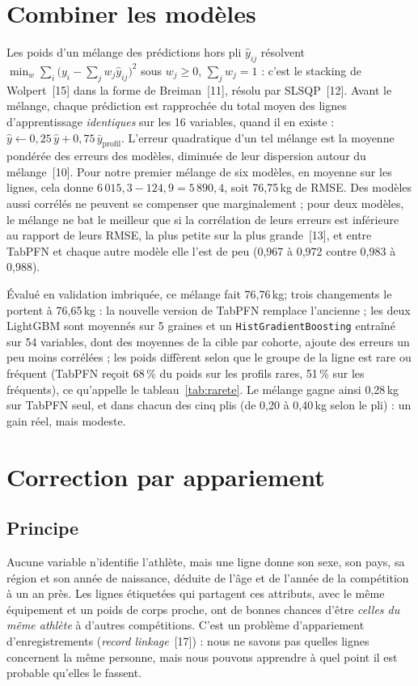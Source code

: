 \documentclass[11pt,a4paper]{article}
\newcommand{\code}[1]{\texttt{\small #1}}
\newcommand{\kg}{\,kg}
\newcounter{tab}
\begin{document}
\section{Combiner les modèles}\label{sec:melange}
Les poids d'un mélange des prédictions hors pli $\hat y_{ij}$ résolvent
$\min_w \sum_i \big(y_i - \sum_j w_j \hat y_{ij}\big)^2$ sous $w_j \ge 0$, $\sum_j w_j = 1$ : c'est le stacking de
Wolpert~[15] dans la forme de Breiman~[11], résolu par SLSQP~[12]. Avant le mélange, chaque prédiction est
rapprochée du total moyen des lignes d'apprentissage \emph{identiques} sur les 16 variables, quand il en
existe : $\hat y \leftarrow 0{,}25\,\hat y + 0{,}75\,\bar y_{\text{profil}}$. L'erreur quadratique d'un tel mélange
est la moyenne pondérée des erreurs des modèles, diminuée de leur dispersion autour du mélange~[10]. Pour
notre premier mélange de six modèles, en moyenne sur les lignes, cela donne $6\,015{,}3 - 124{,}9 = 5\,890{,}4$,
soit 76,75\kg{} de RMSE. Des modèles aussi corrélés ne peuvent se compenser
que marginalement ; pour deux modèles, le mélange ne bat le meilleur que si la corrélation de leurs erreurs
est inférieure au rapport de leurs RMSE, la plus petite sur la plus grande~[13], et entre TabPFN et chaque autre modèle elle l'est de peu
(0,967 à 0,972 contre 0,983 à 0,988).

Évalué en validation imbriquée, ce mélange fait 76,76\kg ; trois changements le portent à 76,65\kg{} : la nouvelle version de
TabPFN remplace l'ancienne ; les deux LightGBM sont moyennés sur 5 graines et un \code{HistGradientBoosting}
entraîné sur 54 variables, dont des moyennes de la cible par cohorte, ajoute des erreurs un peu moins
corrélées ; les poids diffèrent selon que le groupe de la ligne est rare ou fréquent (TabPFN reçoit 68\,\% du
poids sur les profils rares, 51\,\% sur les fréquents), ce qu'appelle le tableau~\ref{tab:rarete}. Le mélange
gagne ainsi 0,28\kg{} sur TabPFN seul, et dans chacun des cinq plis (de 0,20 à 0,40\kg{} selon le pli) : un gain réel, mais modeste.

\section{Correction par appariement}\label{sec:appariement}

\subsection{Principe}
Aucune variable n'identifie l'athlète, mais une ligne donne son sexe, son pays, sa région et son année de
naissance, déduite de l'âge et de l'année de la compétition à un an près. Les lignes étiquetées qui partagent
ces attributs, avec le même équipement et un poids de corps proche, ont de bonnes chances d'être
\emph{celles du même athlète} à d'autres compétitions. C'est un problème d'appariement d'enregistrements
(\emph{record linkage}~[17]) : nous ne savons pas quelles lignes concernent la même personne, mais nous
pouvons apprendre à quel point il est probable qu'elles le fassent.
\end{document}
